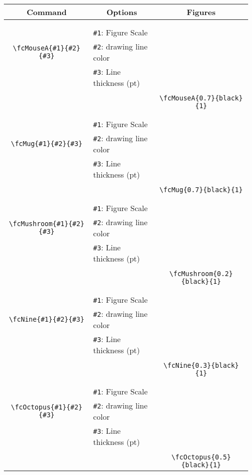 \documentclass[x11names]{article}
\begin{document}
\begin{table}[H]\centering\begin{tabular}{|c|l|c|}\hline {\bf Command}& \multicolumn{1}{c|}{{\bf Options}} & {\bf Figures}\\  \hline	&&\multirow{5}{*}{\fcMouseA{0.7}{black}{1}}\\	&&\\	&\verb|#1|: Figure Scale &\\	\verb|\fcMouseA{#1}{#2}{#3}|&	\verb|#2|: drawing line color &\\	&\verb|#3|: Line thickness (pt) &\\ &&\\&&	\verb|\fcMouseA{0.7}{black}{1}|\\\hline 	
	&&\multirow{5}{*}{\fcMug{0.7}{black}{1}}\\	&&\\	&\verb|#1|: Figure Scale &\\	\verb|\fcMug{#1}{#2}{#3}|&	\verb|#2|: drawing line color &\\	&\verb|#3|: Line thickness (pt) &\\ &&\\&&	\verb|\fcMug{0.7}{black}{1}|\\\hline 	
	&&\multirow{5}{*}{\fcMushroom{0.2}{black}{1}}\\	&&\\	&\verb|#1|: Figure Scale &\\	\verb|\fcMushroom{#1}{#2}{#3}|&	\verb|#2|: drawing line color &\\	&\verb|#3|: Line thickness (pt) &\\ &&\\&&	\verb|\fcMushroom{0.2}{black}{1}|\\\hline 	
	&&\multirow{5}{*}{\fcNine{0.3}{black}{1}}\\	&&\\	&\verb|#1|: Figure Scale &\\	\verb|\fcNine{#1}{#2}{#3}|&	\verb|#2|: drawing line color &\\	&\verb|#3|: Line thickness (pt) &\\ &&\\&&	\verb|\fcNine{0.3}{black}{1}|\\\hline 	
	&&\multirow{5}{*}{\fcOctopus{0.5}{black}{1}}\\	&&\\	&\verb|#1|: Figure Scale &\\	\verb|\fcOctopus{#1}{#2}{#3}|&	\verb|#2|: drawing line color &\\	&\verb|#3|: Line thickness (pt) &\\ &&\\&&	\verb|\fcOctopus{0.5}{black}{1}|\\\hline 	

\end{tabular}
\end{table}
\end{document}
